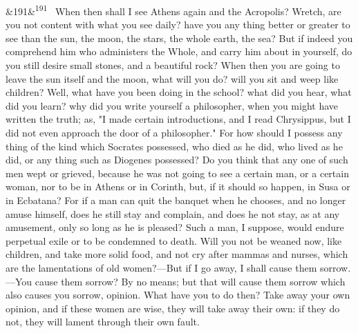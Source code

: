 \documentclass[12pt]{article}
\newcommand{\para}[1][]{\par\noindent\ifx&#1&\else\textsuperscript{\footnotesize #1}~\fi}
\begin{document}
\para[191] When then shall I see Athens again and the Acropolis? Wretch, are you not content with what you see daily? have you any thing better or greater to see than the sun, the moon, the stars, the whole earth, the sea? But if indeed you comprehend him who administers the Whole, and carry him about in yourself, do you still desire small stones, and a beautiful rock? When then you are going to leave the sun itself and the moon, what will you do? will you sit and weep like children? Well, what have you been doing in the school? what did you hear, what did you learn? why did you write yourself a philosopher, when you might have written the truth; as, "I made certain introductions, and I read Chrysippus, but I did not even approach the door of a philosopher." For how should I possess any thing of the kind which Socrates possessed, who died as he did, who lived as he did, or any thing such as Diogenes possessed? Do you think that any one of such men wept or grieved, because he was not going to see a certain man, or a certain woman, nor to be in Athens or in Corinth, but, if it should so happen, in Susa or in Ecbatana? For if a man can quit the banquet when he chooses, and no longer amuse himself, does he still stay and complain, and does he not stay, as at any amusement, only so long as he is pleased? Such a man, I suppose, would endure perpetual exile or to be condemned to death. Will you not be weaned now, like children, and take more solid food, and not cry after mammas and nurses, which are the lamentations of old women?—But if I go away, I shall cause them sorrow.—You cause them sorrow? By no means; but that will cause them sorrow which also causes you sorrow, opinion. What have you to do then? Take away your own opinion, and if these women are wise, they will take away their own: if they do not, they will lament through their own fault.
\end{document}
